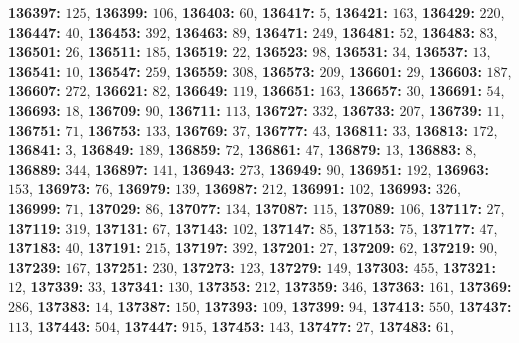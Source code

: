 \textsf{\bfseries 136397:} $125$, \textsf{\bfseries 136399:} $106$, \textsf{\bfseries 136403:} $60$, \textsf{\bfseries 136417:} $5$, \textsf{\bfseries 136421:} $163$, \textsf{\bfseries 136429:} $220$, \textsf{\bfseries 136447:} $40$, \textsf{\bfseries 136453:} $392$, \textsf{\bfseries 136463:} $89$, \textsf{\bfseries 136471:} $249$, \textsf{\bfseries 136481:} $52$, \textsf{\bfseries 136483:} $83$, \textsf{\bfseries 136501:} $26$, \textsf{\bfseries 136511:} $185$, \textsf{\bfseries 136519:} $22$, \textsf{\bfseries 136523:} $98$, \textsf{\bfseries 136531:} $34$, \textsf{\bfseries 136537:} $13$, \textsf{\bfseries 136541:} $10$, \textsf{\bfseries 136547:} $259$, \textsf{\bfseries 136559:} $308$, \textsf{\bfseries 136573:} $209$, \textsf{\bfseries 136601:} $29$, \textsf{\bfseries 136603:} $187$, \textsf{\bfseries 136607:} $272$, \textsf{\bfseries 136621:} $82$, \textsf{\bfseries 136649:} $119$, \textsf{\bfseries 136651:} $163$, \textsf{\bfseries 136657:} $30$, \textsf{\bfseries 136691:} $54$, \textsf{\bfseries 136693:} $18$, \textsf{\bfseries 136709:} $90$, \textsf{\bfseries 136711:} $113$, \textsf{\bfseries 136727:} $332$, \textsf{\bfseries 136733:} $207$, \textsf{\bfseries 136739:} $11$, \textsf{\bfseries 136751:} $71$, \textsf{\bfseries 136753:} $133$, \textsf{\bfseries 136769:} $37$, \textsf{\bfseries 136777:} $43$, \textsf{\bfseries 136811:} $33$, \textsf{\bfseries 136813:} $172$, \textsf{\bfseries 136841:} $3$, \textsf{\bfseries 136849:} $189$, \textsf{\bfseries 136859:} $72$, \textsf{\bfseries 136861:} $47$, \textsf{\bfseries 136879:} $13$, \textsf{\bfseries 136883:} $8$, \textsf{\bfseries 136889:} $344$, \textsf{\bfseries 136897:} $141$, \textsf{\bfseries 136943:} $273$, \textsf{\bfseries 136949:} $90$, \textsf{\bfseries 136951:} $192$, \textsf{\bfseries 136963:} $153$, \textsf{\bfseries 136973:} $76$, \textsf{\bfseries 136979:} $139$, \textsf{\bfseries 136987:} $212$, \textsf{\bfseries 136991:} $102$, \textsf{\bfseries 136993:} $326$, \textsf{\bfseries 136999:} $71$, \textsf{\bfseries 137029:} $86$, \textsf{\bfseries 137077:} $134$, \textsf{\bfseries 137087:} $115$, \textsf{\bfseries 137089:} $106$, \textsf{\bfseries 137117:} $27$, \textsf{\bfseries 137119:} $319$, \textsf{\bfseries 137131:} $67$, \textsf{\bfseries 137143:} $102$, \textsf{\bfseries 137147:} $85$, \textsf{\bfseries 137153:} $75$, \textsf{\bfseries 137177:} $47$, \textsf{\bfseries 137183:} $40$, \textsf{\bfseries 137191:} $215$, \textsf{\bfseries 137197:} $392$, \textsf{\bfseries 137201:} $27$, \textsf{\bfseries 137209:} $62$, \textsf{\bfseries 137219:} $90$, \textsf{\bfseries 137239:} $167$, \textsf{\bfseries 137251:} $230$, \textsf{\bfseries 137273:} $123$, \textsf{\bfseries 137279:} $149$, \textsf{\bfseries 137303:} $455$, \textsf{\bfseries 137321:} $12$, \textsf{\bfseries 137339:} $33$, \textsf{\bfseries 137341:} $130$, \textsf{\bfseries 137353:} $212$, \textsf{\bfseries 137359:} $346$, \textsf{\bfseries 137363:} $161$, \textsf{\bfseries 137369:} $286$, \textsf{\bfseries 137383:} $14$, \textsf{\bfseries 137387:} $150$, \textsf{\bfseries 137393:} $109$, \textsf{\bfseries 137399:} $94$, \textsf{\bfseries 137413:} $550$, \textsf{\bfseries 137437:} $113$, \textsf{\bfseries 137443:} $504$, \textsf{\bfseries 137447:} $915$, \textsf{\bfseries 137453:} $143$, \textsf{\bfseries 137477:} $27$, \textsf{\bfseries 137483:} $61$, 
